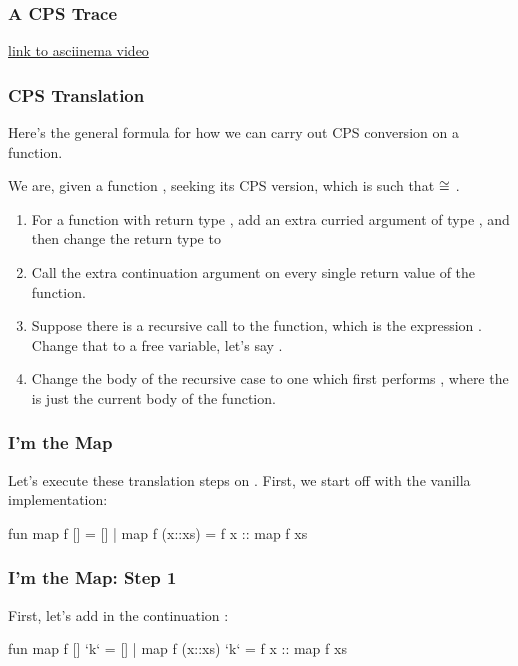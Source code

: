 \documentclass[aspectratio=169]{beamer}
\begin{document}
\begin{frame}[fragile]
  \frametitle{A CPS Trace}

  \begin{center}
    \huge \color{blue} \href{https://asciinema.org/a/WxUSfzU1xOdbJkikgyy6wFJ0l}{link to asciinema video}
\end{center}
\end{frame}


\begin{frame}[fragile]
  \frametitle{CPS Translation}

  Here's the general formula for how we can carry out CPS conversion on a function.

  We are, given a function , seeking its CPS version, which is
   such that  $\cong$ .

  \begin{enumerate}
    \item For a function with return type , add an extra curried argument
    of type , and then change the return type to 
    \item Call the extra continuation argument on every single return value of
    the function.
    \item Suppose there is a recursive call to the function, which is the expression
    . Change that to a free variable, let's say . 
    \item Change the body of the recursive case to one which first performs 
    , where the  is just the current 
    body of the function.
  \end{enumerate}
\end{frame}

\begin{frame}[fragile]
  \frametitle{I'm the Map}

  Let's execute these translation steps on . First, we start off with
  the vanilla implementation:

  \begin{codeblock}
    fun map f []      = []
      | map f (x::xs) = 
          f x :: map f xs
  \end{codeblock}
\end{frame}

\begin{frame}[fragile]
  \frametitle{I'm the Map: Step 1}

  First, let's add in the continuation :

  \begin{codeblock}
    fun map f [] `k`      = []
      | map f (x::xs) `k` = 
          f x :: map f xs
  \end{codeblock}
\end{frame}
\end{document}
